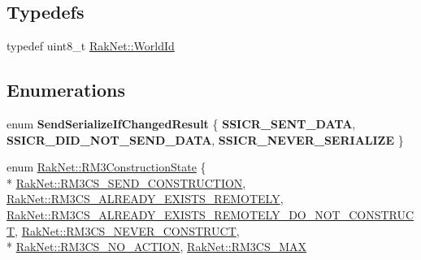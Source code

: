 \subsection*{Typedefs}
\begin{DoxyCompactItemize}
\item 
typedef uint8\-\_\-t \hyperlink{group___r_e_p_l_i_c_a___m_a_n_a_g_e_r___g_r_o_u_p3_ga44b59af8e882248f61aa41d8ace38bf7}{Rak\-Net\-::\-World\-Id}
\end{DoxyCompactItemize}
\subsection*{Enumerations}
\begin{DoxyCompactItemize}
\item 
enum {\bfseries Send\-Serialize\-If\-Changed\-Result} \{ {\bfseries S\-S\-I\-C\-R\-\_\-\-S\-E\-N\-T\-\_\-\-D\-A\-T\-A}, 
{\bfseries S\-S\-I\-C\-R\-\_\-\-D\-I\-D\-\_\-\-N\-O\-T\-\_\-\-S\-E\-N\-D\-\_\-\-D\-A\-T\-A}, 
{\bfseries S\-S\-I\-C\-R\-\_\-\-N\-E\-V\-E\-R\-\_\-\-S\-E\-R\-I\-A\-L\-I\-Z\-E}
 \}
\item 
enum \hyperlink{group___r_e_p_l_i_c_a___m_a_n_a_g_e_r___g_r_o_u_p3_ga16aaecf3c23582f0de6652b348ccfa38}{Rak\-Net\-::\-R\-M3\-Construction\-State} \{ \\*
\hyperlink{group___r_e_p_l_i_c_a___m_a_n_a_g_e_r___g_r_o_u_p3_gga16aaecf3c23582f0de6652b348ccfa38a508beae91f54ce89c22160c43a608fe1}{Rak\-Net\-::\-R\-M3\-C\-S\-\_\-\-S\-E\-N\-D\-\_\-\-C\-O\-N\-S\-T\-R\-U\-C\-T\-I\-O\-N}, 
\hyperlink{group___r_e_p_l_i_c_a___m_a_n_a_g_e_r___g_r_o_u_p3_gga16aaecf3c23582f0de6652b348ccfa38a830fdf9eb729456bb62c8f3116afe260}{Rak\-Net\-::\-R\-M3\-C\-S\-\_\-\-A\-L\-R\-E\-A\-D\-Y\-\_\-\-E\-X\-I\-S\-T\-S\-\_\-\-R\-E\-M\-O\-T\-E\-L\-Y}, 
\hyperlink{group___r_e_p_l_i_c_a___m_a_n_a_g_e_r___g_r_o_u_p3_gga16aaecf3c23582f0de6652b348ccfa38a526a86138ec25d79d3981860bd09d4e3}{Rak\-Net\-::\-R\-M3\-C\-S\-\_\-\-A\-L\-R\-E\-A\-D\-Y\-\_\-\-E\-X\-I\-S\-T\-S\-\_\-\-R\-E\-M\-O\-T\-E\-L\-Y\-\_\-\-D\-O\-\_\-\-N\-O\-T\-\_\-\-C\-O\-N\-S\-T\-R\-U\-C\-T}, 
\hyperlink{group___r_e_p_l_i_c_a___m_a_n_a_g_e_r___g_r_o_u_p3_gga16aaecf3c23582f0de6652b348ccfa38a7340e8e1ecf573595a196376ac02eb3c}{Rak\-Net\-::\-R\-M3\-C\-S\-\_\-\-N\-E\-V\-E\-R\-\_\-\-C\-O\-N\-S\-T\-R\-U\-C\-T}, 
\\*
\hyperlink{group___r_e_p_l_i_c_a___m_a_n_a_g_e_r___g_r_o_u_p3_gga16aaecf3c23582f0de6652b348ccfa38a28922f257ecef864a4490ec6aae6a48b}{Rak\-Net\-::\-R\-M3\-C\-S\-\_\-\-N\-O\-\_\-\-A\-C\-T\-I\-O\-N}, 
\hyperlink{group___r_e_p_l_i_c_a___m_a_n_a_g_e_r___g_r_o_u_p3_gga16aaecf3c23582f0de6652b348ccfa38afd4d901f7fd70e9fa64c911d427a14a0}{Rak\-Net\-::\-R\-M3\-C\-S\-\_\-\-M\-A\-X}

\end{DoxyCompactItemize}
